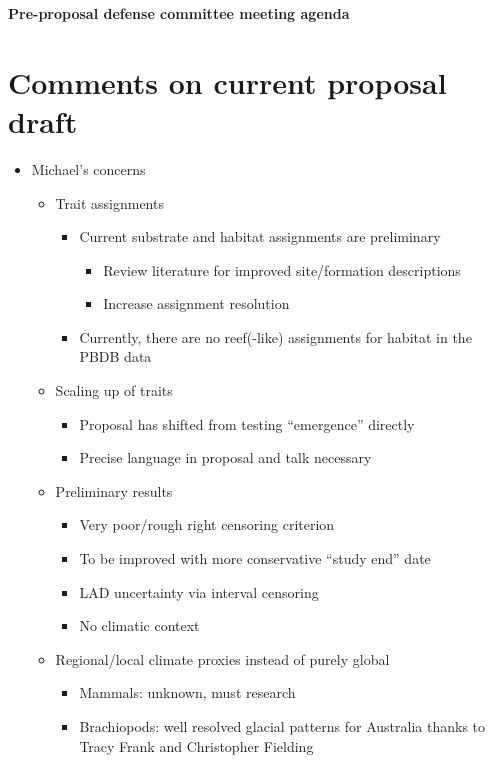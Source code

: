 \documentclass[12pt,letterpaper]{article}
\begin{document}
\setcounter{secnumdepth}{0}

\begin{Large}
  \textbf{Pre-proposal defense committee meeting agenda}
\end{Large}

\section{Comments on current proposal draft}
\begin{itemize}
  \item Michael's concerns
    \begin{itemize}
      \item Trait assignments
        \begin{itemize}
          \item Current substrate and habitat assignments are preliminary
            \begin{itemize}
              \item Review literature for improved site/formation descriptions
              \item Increase assignment resolution
            \end{itemize}
          \item Currently, there are no reef(-like) assignments for habitat in the PBDB data
        \end{itemize}
      \item Scaling up of traits
        \begin{itemize}
          \item Proposal has shifted from testing ``emergence'' directly
          \item Precise language in proposal and talk necessary
        \end{itemize}
      \item Preliminary results
        \begin{itemize}
          \item Very poor/rough right censoring criterion
          \item To be improved with more conservative ``study end'' date
          \item LAD uncertainty via interval censoring
          \item No climatic context
        \end{itemize}
      \item Regional/local climate proxies instead of purely global
        \begin{itemize}
          \item Mammals: unknown, must research
          \item Brachiopods: well resolved glacial patterns for Australia thanks to Tracy Frank and Christopher Fielding
        \end{itemize}
    \end{itemize}
\end{itemize}
\end{document}
